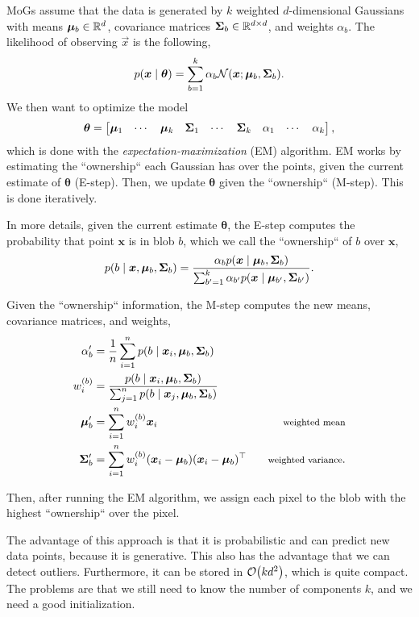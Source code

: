MoGs assume that the data is generated by $k$ weighted $d$-dimensional
Gaussians with means $\bm{\mu}_b\in\mathbb{R}^d$, covariance matrices
$\bm{\Sigma}_b\in\mathbb{R}^{d\times d}$, and weights $\alpha_b$. The likelihood of
observing $\vec{x}$ is the following, \[
  p(\bm{x}\mid\bm{\theta}) = \sum_{b=1}^k \alpha_b \mathcal{N}(\bm{x}; \bm{\mu}_b,\bm{\Sigma}_b)
.\]
We then want to optimize the model \wrt \[
  \bm{\theta} = \begin{bmatrix} \bm{\mu}_1 & \cdots & \bm{\mu}_k & \bm{\Sigma}_1 & \cdots & \bm{\Sigma}_k & \alpha_1 & \cdots & \alpha_k \end{bmatrix}
,\]
which is done with the \textit{expectation-maximization} (EM) algorithm. EM
works by estimating the ``ownership`` each Gaussian has over the points, given
the current estimate of $\bm{\theta}$ (E-step). Then, we update $\bm{\theta}$
given the ``ownership`` (M-step). This is done iteratively.

In more details, given the current estimate $\bm{\theta}$, the E-step
computes the probability that point $\bm{x}$ is in blob $b$, which we call
the ``ownership`` of $b$ over $\bm{x}$, \[
  p(b\mid \bm{x},\bm{\mu}_b,\bm{\Sigma}_b) = \frac{\alpha_b p(\bm{x}\mid \bm{\mu}_b,\bm{\Sigma}_b)}{\sum_{b'=1}^k \alpha_{b'}p(\bm{x}\mid\bm{\mu}_{b'},\bm{\Sigma}_{b'})}
.\]

Given the ``ownership`` information, the M-step computes the new means,
covariance matrices, and weights,
\begin{align*}
  \alpha_b' &= \frac{1}{n} \sum_{i=1}^n p(b\mid \vec{x}_i,\vec{\mu}_b,\mat{\Sigma}_b) \\
  w^{(b)}_i &= \frac{p(b\mid \vec{x}_i,\vec{\mu}_b,\mat{\Sigma}_b)}{\sum_{j=1}^n p(b\mid \vec{x}_j,\vec{\mu}_b,\mat{\Sigma}_b)} \\
  \vec{\mu}_b' &= \sum_{i=1}^n w^{(b)}_i\vec{x}_i & \text{\footnotesize weighted mean} \\
  \mat{\Sigma}_b' &= \sum_{i=1}^n w^{(b)}_i (\vec{x}_i - \vec{\mu}_b) (\vec{x}_i - \vec{\mu}_b)^\top & \text{\footnotesize weighted variance}
.\end{align*}

Then, after running the EM algorithm, we assign each pixel to the blob with
the highest ``ownership`` over the pixel.

The advantage of this approach is that it is probabilistic and can predict new
data points, because it is generative. This also has the advantage that we can
detect outliers. Furthermore, it can be stored in $\bigo{kd^2}$, which is quite
compact. The problems are that we still need to know the number of components
$k$, and we need a good initialization.

